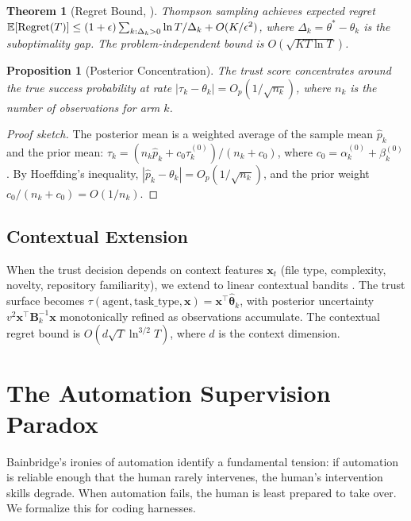 \documentclass[11pt, a4paper, copyright]{googledeepmind}
\newtheorem{theorem}{Theorem}[section]
\newtheorem{proposition}{Proposition}[section]
\begin{document}
\begin{theorem}[Regret Bound, \citealt{agrawal2012analysis}]
\label{thm:regret}
Thompson sampling achieves expected regret $\mathbb{E}[\textup{Regret}(T)] \leq (1+\epsilon) \sum_{k: \Delta_k > 0} \ln T / \Delta_k + O(K/\epsilon^2)$, where $\Delta_k = \theta^* - \theta_k$ is the suboptimality gap. The problem-independent bound is $O(\sqrt{KT \ln T})$.
\end{theorem}

\begin{proposition}[Posterior Concentration]
\label{prop:concentration}
The trust score concentrates around the true success probability at rate $|\tau_k - \theta_k| = O_p(1/\sqrt{n_k})$, where $n_k$ is the number of observations for arm $k$.
\end{proposition}

\begin{proof}[Proof sketch]
The posterior mean is a weighted average of the sample mean $\hat{p}_k$ and the prior mean: $\tau_k = (n_k \hat{p}_k + c_0 \tau_k^{(0)}) / (n_k + c_0)$, where $c_0 = \alpha_k^{(0)} + \beta_k^{(0)}$. By Hoeffding's inequality, $|\hat{p}_k - \theta_k| = O_p(1/\sqrt{n_k})$, and the prior weight $c_0/(n_k + c_0) = O(1/n_k)$.
\end{proof}

\subsection{Contextual Extension}

When the trust decision depends on context features $\mathbf{x}_t$ (file type, complexity, novelty, repository familiarity), we extend to linear contextual bandits \citep{li2010contextual, agrawal2013thompson}. The trust surface becomes $\tau(\text{agent}, \text{task\_type}, \mathbf{x}) = \mathbf{x}^\top \hat{\boldsymbol{\theta}}_k$, with posterior uncertainty $v^2 \mathbf{x}^\top \mathbf{B}_k^{-1} \mathbf{x}$ monotonically refined as observations accumulate. The contextual regret bound is $O(d\sqrt{T} \ln^{3/2} T)$, where $d$ is the context dimension.

\section{The Automation Supervision Paradox}
\label{sec:bainbridge}

Bainbridge's \citeyearpar{bainbridge1983ironies} ironies of automation identify a fundamental tension: if automation is reliable enough that the human rarely intervenes, the human's intervention skills degrade. When automation fails, the human is least prepared to take over. We formalize this for coding harnesses.
\end{document}
